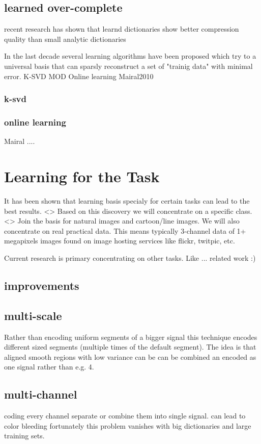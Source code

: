 \subsection{learned over-complete}
recent research has shown that learnd dictionaries show better compression quality than small analytic dictionaries \cite{Aharon2006} \cite{Chen1998} 


In the last decade several learning algorithms have been proposed which try to a universal basis that 
can sparsly reconstruct a set of "trainig data" with minimal error. 
K-SVD
MOD
Online learning
Mairal2010

\subsubsection{k-svd}
\subsubsection{online learning}
Mairal .... \cite{Mairal2010}

\section{Learning for the Task}
It has been shown that learning basis specialy for certain tasks can lead to the best results\cite{}.  <>
Based on this discovery we will concentrate on a specific class. <> Join the basis for natural images and cartoon/line images.
We will also concentrate on real practical data. This means typically 3-channel data of 1+ megapixels images found on image hosting services like flickr, twitpic, etc.

Current research is primary concentrating on other tasks. 
Like ... related work :)

\subsection{improvements}
\subsection{multi-scale}
Rather than encoding uniform segments of a bigger signal this technique encodes different sized 
segments (multiple times of the default segment). The idea is that aligned smooth regions with low variance can be 
can be combined an encoded as one signal rather than e.g. 4. 

\cite{saprio}
\subsection{multi-channel}
coding every channel separate or combine them
into single signal. can lead to color bleeding \cite{mairal08sparse}
fortunately this problem vanishes with big dictionaries and large training sets. \cite{mairal08sparse}


